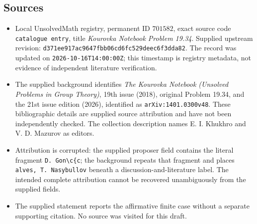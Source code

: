 \documentclass[11pt]{article}
\begin{document}
\subsection{Sources}
\begin{itemize}
\item Local UnsolvedMath registry, permanent ID \(701582\), exact source code \texttt{catalogue entry}, title \emph{Kourovka Notebook Problem 19.34}. Supplied upstream revision: \texttt{d371ee917ac9647fbb06cd6fc529deec6f3dda82}. The record was updated on \texttt{2026-10-16T14:00:00Z}; this timestamp is registry metadata, not evidence of independent literature verification.
\item The supplied background identifies \emph{The Kourovka Notebook (Unsolved Problems in Group Theory)}, 19th issue (2018), original Problem 19.34, and the 21st issue edition (2026), identified as \texttt{arXiv:1401.0300v48}. These bibliographic details are supplied source attribution and have not been independently checked. The collection description names E. I. Khukhro and V. D. Mazurov as editors.
\item Attribution is corrupted: the supplied proposer field contains the literal fragment \texttt{D. Gon\textbackslash{}c\{c}; the background repeats that fragment and places \texttt{alves, T. Nasybullov} beneath a discussion-and-literature label. The intended complete attribution cannot be recovered unambiguously from the supplied fields.
\item The supplied statement reports the affirmative finite case without a separate supporting citation. No source was visited for this draft.
\end{itemize}
\end{document}
